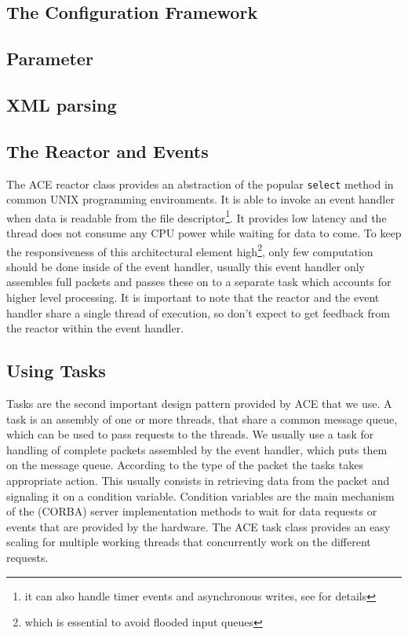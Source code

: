 \subsection{The Configuration Framework}

\subsection{Parameter}

\subsection{XML parsing}

\subsection{The Reactor and Events}

The ACE reactor class provides an abstraction of the popular
{\tt select} method in common UNIX programming environments. It is
able to invoke an event handler when data is readable from the file
descriptor\footnote{it can also handle timer events and asynchronous
  writes, see \cite{ACE-Manual} for details}. It provides low
latency and the thread does not consume any CPU power while waiting
for data to come. To keep the responsiveness of this architectural
element high\footnote{which is essential to avoid flooded input
  queues}, only few computation should be done inside of the event
handler, usually this event handler only assembles full packets and
passes these on to a separate task which accounts for higher level
processing. It is important to note that the reactor and the event
handler share a single thread of execution, so don't expect to get
feedback from the reactor within the event handler. 


\subsection{Using Tasks}

Tasks are the second important design pattern provided by ACE that we use.
A task is an assembly of one or more threads, that share a common
message queue, which can be used to pass requests to the threads. We
usually use a task for handling of complete packets assembled by the
event handler, which puts them on the message queue. According to the
type of the packet the tasks takes appropriate action. This usually
consists in retrieving data from the packet and signaling it on a
condition variable. Condition variables are the main mechanism of the
(CORBA) server implementation methods to wait for data requests or
events that are provided by the hardware. The ACE task class provides
an easy scaling for multiple working threads that concurrently work on 
the different requests.

